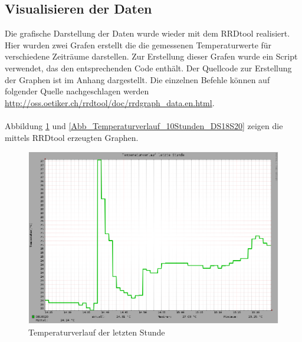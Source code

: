 \subsection{Visualisieren der Daten}
\label{subsection_Visualisieren der Daten DS18S20}
Die grafische Darstellung der Daten wurde wieder mit dem RRDtool realisiert. Hier wurden zwei Grafen erstellt die die gemessenen Temperaturwerte für verschiedene Zeiträume darstellen. Zur Erstellung dieser Grafen wurde ein Script verwendet, das den entsprechenden Code enthält. Der Quellcode zur Erstellung der Graphen ist im Anhang dargestellt. Die einzelnen Befehle können auf folgender Quelle nachgeschlagen werden \url{http://oss.oetiker.ch/rrdtool/doc/rrdgraph_data.en.html}.\\
\\Abbildung \ref{Abb_Temperaturverlauf_Stunde_DS18S20} und \ref{Abb_Temperaturverlauf_10Stunden_DS18S20} zeigen die mittels RRDtool erzeugten Graphen.

\begin{figure}[!h] 
  \centering
     \includegraphics[scale=.28]{BilderAllgemein/TemperaturStunde.png}
  \caption{Temperaturverlauf der letzten Stunde}
  \label{Abb_Temperaturverlauf_Stunde_DS18S20}
\end{figure}

